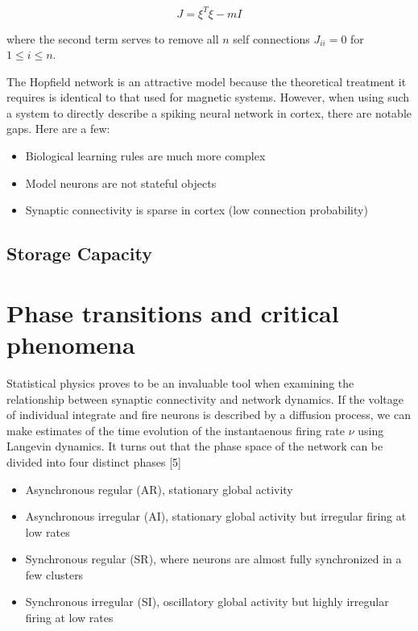 \documentclass{article} %
\begin{document}
\begin{equation*}
J = \xi^{T}\xi - mI
\end{equation*}

where the second term serves to remove all $n$ self connections $J_{ii} = 0$ for $1 \leq i \leq n$. 


The Hopfield network is an attractive model because the theoretical treatment it requires is identical to that used for magnetic systems. However, when using such a system to directly describe a spiking neural network in cortex, there are notable gaps. Here are a few:

\begin{itemize}
  \item Biological learning rules are much more complex
  \item Model neurons are not stateful objects
  \item Synaptic connectivity is sparse in cortex (low connection probability)
\end{itemize}


\subsection{Storage Capacity}




\section{Phase transitions and critical phenomena}

Statistical physics proves to be an invaluable tool when examining the relationship between synaptic connectivity and network dynamics. If the voltage of individual integrate and fire neurons is described by a diffusion process, we can make estimates of the time evolution of the instantaenous firing rate $\nu$ using Langevin dynamics. It turns out that the phase space of the network can be divided into four distinct phases [5]

\begin{itemize}
  \item Asynchronous regular (AR), stationary global activity
  \item Asynchronous irregular (AI), stationary global activity but irregular firing at low rates
  \item Synchronous regular (SR), where neurons are almost fully synchronized in a few clusters
  \item Synchronous irregular (SI), oscillatory global activity but highly irregular firing at low rates
\end{itemize}
\end{document}
